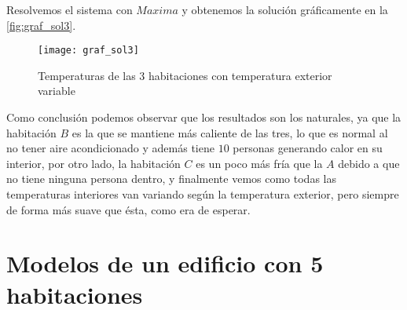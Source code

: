 Resolvemos el sistema con $Maxima$ y obtenemos la solución gráficamente en la \autoref{fig:graf_sol3}.
\begin{figure}[h!]
	\centering
	\texttt{[image: graf\_sol3]}
	\caption{Temperaturas de las 3 habitaciones con temperatura exterior variable}
	\label{fig:graf_sol3}
\end{figure}
Como conclusión podemos observar que los resultados son los naturales, ya que la habitación $B$ es la que se mantiene más caliente de las tres, lo que es normal al no tener aire acondicionado y además tiene $10$ personas generando calor en su interior, por otro lado, la habitación $C$ es un poco más fría que la $A$ debido a que no tiene ninguna persona dentro, y finalmente vemos como todas las temperaturas interiores van variando según la temperatura exterior, pero siempre de forma más suave que ésta, como era de esperar.
\section{Modelos de un edificio con 5 habitaciones}
